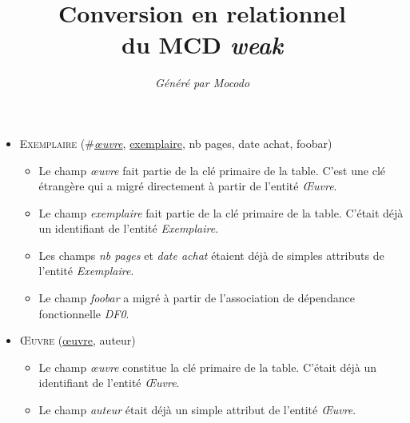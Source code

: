 \documentclass[a4paper]{article}
\title{Conversion en relationnel\\du MCD \emph{weak}}
\author{\emph{Généré par Mocodo}}
\newcommand{\relat}[1]{\textsc{#1}}
\newcommand{\attr}[1]{#1}
\newcommand{\prim}[1]{\uline{#1}}
\newcommand{\foreign}[1]{\#\textsl{#1}}
\begin{document}
\maketitle

\begin{itemize}
  \item \relat{Exemplaire} (\foreign{\prim{œuvre}}, \prim{exemplaire}, \attr{nb pages}, \attr{date achat}, \attr{foobar})
  \begin{itemize}
    \item Le champ \emph{œuvre} fait partie de la clé primaire de la table. C'est une clé étrangère qui a migré directement à partir de l'entité \emph{Œuvre}.
    \item Le champ \emph{exemplaire} fait partie de la clé primaire de la table. C'était déjà un identifiant de l'entité \emph{Exemplaire}.
    \item Les champs \emph{nb pages} et \emph{date achat} étaient déjà de simples attributs de l'entité \emph{Exemplaire}.
    \item Le champ \emph{foobar} a migré à partir de l'association de dépendance fonctionnelle \emph{DF0}.
  \end{itemize}

  \item \relat{Œuvre} (\prim{œuvre}, \attr{auteur})
  \begin{itemize}
    \item Le champ \emph{œuvre} constitue la clé primaire de la table. C'était déjà un identifiant de l'entité \emph{Œuvre}.
    \item Le champ \emph{auteur} était déjà un simple attribut de l'entité \emph{Œuvre}.
  \end{itemize}

\end{itemize}
\end{document}
